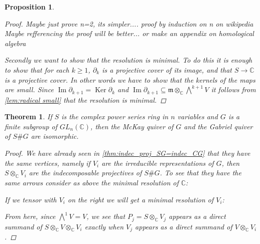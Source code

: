 \documentclass[11pt, a4paper, english]{article}
\newtheorem{prop}{Proposition}
\numberwithin{prop}{section}
\numberwithin{lemma}{section}
\newtheorem{theorem}{Theorem}
\numberwithin{theorem}{section}
\numberwithin{defin}{section}
\numberwithin{example}{section}
\newcommand{\C}{\mathbb{C}}
\DeclareMathOperator{\Image}{Im}
\DeclareMathOperator{\Ker}{Ker}
\begin{document}
\begin{prop}
\begin{proof}
Maybe just prove n=2, its simpler....
proof by induction on n on wikipedia %
{\color{red}Maybe refferencing the proof will be better... or make an appendix on homological algebra}
\fi

Secondly we want to show that the resolution is minimal. To do this it is enough to show that for each $k \geq 1$, $\partial_k$ is a projective cover of its image, and that $S \to \C$ is a projective cover. In other words we have to show that the kernels of the maps are small. Since $\Image \partial_{k+1} = \Ker \partial_k$ and $\Image \partial_{k+1} \subseteq \mathfrak{m} \otimes_\C \bigwedge\limits^{k+1}V$ it follows from \cref{lem:radical small} that the resolution is minimal.
\end{proof}
\end{prop}

\begin{theorem}
If $S$ is the complex power series ring in $n$ variables and $G$ is a finite subgroup of $GL_n(\C)$, then the McKay quiver of $G$ and the Gabriel quiver of $S\#G$ are isomorphic.
\begin{proof}
We have already seen in \cref{thm:indec_proj_SG=indec_CG} that they have the same vertices, namely if $V_i$ are the irreducible representations of $G$, then $S \otimes_\C V_i$ are the indecomposable projectives of $S\#G$. To see that they have the same arrows consider as above the minimal resolution of $\C$:
\begin{center}
\end{center}
If we tensor with $V_i$ on the right we will get a minimal resolution of $V_i$:
\begin{center}
\end{center}
From here, since $\bigwedge\limits^{1} V = V$, we see that $P_j = S \otimes_\C V_j$ appears as a direct summand of $S \otimes_\C V \otimes_\C V_i$ exactly when $V_j$ appears as a direct summand of $V \otimes_\C V_i$.
\end{proof}
\end{theorem}
\end{document}
